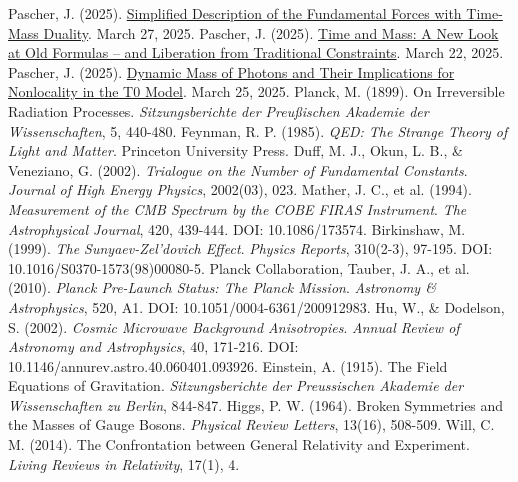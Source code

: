 \documentclass[12pt,a4paper]{article}
\begin{document}
\begin{thebibliography}{99}
		 Pascher, J. (2025). \href{https://github.com/jpascher/T0-Time-Mass-Duality/tree/main/2/pdf/English/VierKraefteZeitMasseEn.pdf}{Simplified Description of the Fundamental Forces with Time-Mass Duality}. March 27, 2025.
		 Pascher, J. (2025). \href{https://github.com/jpascher/T0-Time-Mass-Duality/tree/main/2/pdf/English/ZeitMasseNeuerBlickEn.pdf}{Time and Mass: A New Look at Old Formulas – and Liberation from Traditional Constraints}. March 22, 2025.
		 Pascher, J. (2025). \href{https://github.com/jpascher/T0-Time-Mass-Duality/tree/main/2/pdf/English/DynMassePhotonenNichtlokalEn.pdf}{Dynamic Mass of Photons and Their Implications for Nonlocality in the T0 Model}. March 25, 2025.
		 Planck, M. (1899). On Irreversible Radiation Processes. \textit{Sitzungsberichte der Preußischen Akademie der Wissenschaften}, 5, 440-480.
		 Feynman, R. P. (1985). \textit{QED: The Strange Theory of Light and Matter}. Princeton University Press.
		 Duff, M. J., Okun, L. B., \& Veneziano, G. (2002). \textit{Trialogue on the Number of Fundamental Constants}. \textit{Journal of High Energy Physics}, 2002(03), 023.
		 Mather, J. C., et al. (1994). \textit{Measurement of the CMB Spectrum by the COBE FIRAS Instrument}. \textit{The Astrophysical Journal}, 420, 439-444. DOI: 10.1086/173574.
		 Birkinshaw, M. (1999). \textit{The Sunyaev-Zel'dovich Effect}. \textit{Physics Reports}, 310(2-3), 97-195. DOI: 10.1016/S0370-1573(98)00080-5.
		 Planck Collaboration, Tauber, J. A., et al. (2010). \textit{Planck Pre-Launch Status: The Planck Mission}. \textit{Astronomy \& Astrophysics}, 520, A1. DOI: 10.1051/0004-6361/200912983.
		 Hu, W., \& Dodelson, S. (2002). \textit{Cosmic Microwave Background Anisotropies}. \textit{Annual Review of Astronomy and Astrophysics}, 40, 171-216. DOI: 10.1146/annurev.astro.40.060401.093926.
		 Einstein, A. (1915). The Field Equations of Gravitation. \textit{Sitzungsberichte der Preussischen Akademie der Wissenschaften zu Berlin}, 844-847.
		 Higgs, P. W. (1964). Broken Symmetries and the Masses of Gauge Bosons. \textit{Physical Review Letters}, 13(16), 508-509.
		 Will, C. M. (2014). The Confrontation between General Relativity and Experiment. \textit{Living Reviews in Relativity}, 17(1), 4.
	\end{thebibliography}
	
\end{document}
